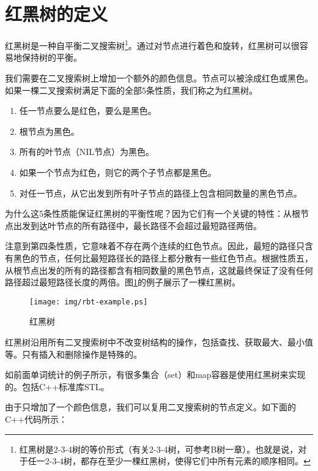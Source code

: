 \documentclass[UTF8]{article}
\begin{document}
\section{红黑树的定义}

红黑树是一种自平衡二叉搜索树\cite{wiki}\footnote{红黑树是2-3-4树的等价形式（有关2-3-4树，可参考B树一章）。也就是说，对于任一2-3-4树，都存在至少一棵红黑树，使得它们中所有元素的顺序相同。}。通过对节点进行着色和旋转，红黑树可以很容易地保持树的平衡。

我们需要在二叉搜索树上增加一个额外的颜色信息。节点可以被涂成红色或黑色。如果一棵二叉搜索树满足下面的全部5条性质，我们称之为红黑树\cite{CLRS}。

\begin{enumerate}
\item 任一节点要么是红色，要么是黑色。
\item 根节点为黑色。
\item 所有的叶节点（NIL节点）为黑色。
\item 如果一个节点为红色，则它的两个子节点都是黑色。
\item 对任一节点，从它出发到所有叶子节点的路径上包含相同数量的黑色节点。
\end{enumerate}

为什么这5条性质能保证红黑树的平衡性呢？因为它们有一个关键的特性：从根节点出发到达叶节点的所有路径中，最长路径不会超过最短路径两倍。

注意到第四条性质，它意味着不存在两个连续的红色节点。因此，最短的路径只含有黑色的节点，任何比最短路径长的路径上都分散有一些红色节点。根据性质五，从根节点出发的所有的路径都含有相同数量的黑色节点，这就最终保证了没有任何路径超过最短路径长度的两倍\cite{wiki}。图\ref{fig:rbt-example}的例子展示了一棵红黑树。

\begin{figure}[htbp]
  \centering
  \texttt{[image: img/rbt-example.ps]}
  \caption{红黑树} \label{fig:rbt-example}
\end{figure}

红黑树沿用所有二叉搜索树中不改变树结构的操作，包括查找、获取最大、最小值等。只有插入和删除操作是特殊的。

如前面单词统计的例子所示，有很多集合（set）和map容器是使用红黑树来实现的。包括C++标准库STL\cite{sgi-stl}。

由于只增加了一个颜色信息，我们可以复用二叉搜索树的节点定义。如下面的C++代码所示：
\end{document}
